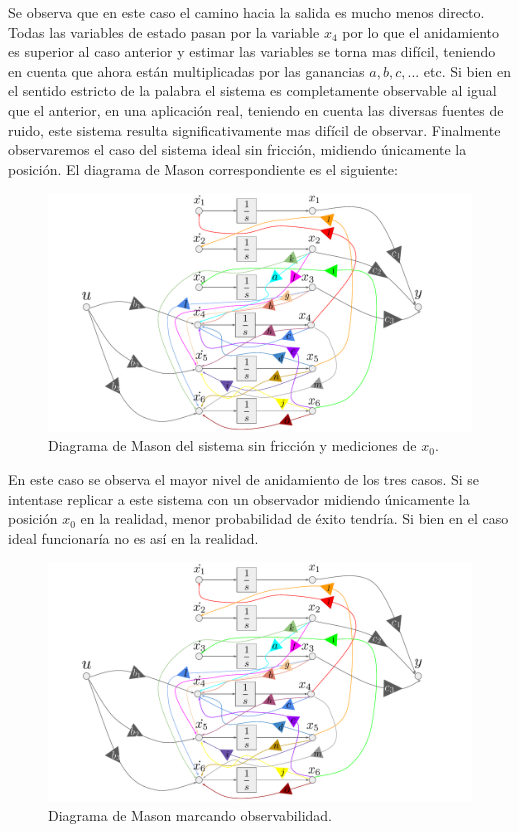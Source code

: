 Se observa que en este caso el camino hacia la salida es mucho menos directo. Todas las variables de estado pasan por la variable $x_4$ por lo que el anidamiento es superior al caso anterior y estimar las variables se torna mas difícil, teniendo en cuenta que ahora están multiplicadas por las ganancias $a,b,c,...$ etc.
Si bien en el sentido estricto de la palabra el sistema es completamente observable al igual que el anterior, en una aplicación real, teniendo en cuenta las diversas fuentes de ruido, este sistema resulta significativamente mas difícil de observar.
Finalmente observaremos el caso del sistema ideal sin fricción, midiendo únicamente la posición. El diagrama de Mason correspondiente es el siguiente:
\begin{figure}[H]
	\centering
	\includegraphics[width=1\linewidth,page = 6]{../Modelo Teorico/ImagenesModelo Teorico/Mason.pdf}
	\caption{Diagrama de Mason del sistema sin fricción y mediciones de $x_0$.}	
	\label{fig:masonsisyxom}
\end{figure}
En este caso se observa el mayor nivel de anidamiento de los tres casos. Si se intentase replicar a este sistema con un observador midiendo únicamente la posición $x_0$ en la realidad, menor probabilidad de éxito tendría. Si bien en el caso ideal funcionaría no es así en la realidad.
\begin{figure}[H]
	\centering
	\includegraphics[width=1\linewidth,page = 7]{../Modelo Teorico/ImagenesModelo Teorico/Mason.pdf}
	\caption{Diagrama de Mason marcando observabilidad.}	
	\label{fig:masonsisyxomO}
\end{figure}

%
